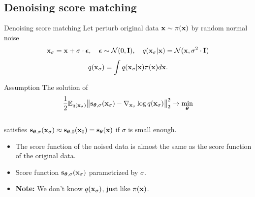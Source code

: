 \subsection{Denoising score matching}
\begin{frame}{Denoising score matching}
	Let perturb original data $\mathbf{x} \sim \pi(\mathbf{x})$ by random normal noise 
	\[
		\mathbf{x}_{\sigma} = \mathbf{x} + \sigma \cdot \boldsymbol{\epsilon}, \quad \boldsymbol{\epsilon} \sim \mathcal{N}(0, \mathbf{I}), \quad q(\mathbf{x}_{\sigma} | \mathbf{x}) = \mathcal{N}(\mathbf{x}, \sigma^2 \cdot \mathbf{I})
	\]
	\vspace{-0.4cm}
	\[
		q(\mathbf{x}_{\sigma}) = \int q(\mathbf{x}_{\sigma} | \mathbf{x}) \pi(\mathbf{x}) d\mathbf{x}.
	\]
	\vspace{-0.5cm} 
	\begin{block}{Assumption}
		The solution of 
		\[
			\frac{1}{2} \mathbb{E}_{q(\mathbf{x}_{\sigma})}\bigl\| \mathbf{s}_{\boldsymbol{\theta}, \sigma}(\mathbf{x}_{\sigma}) - \nabla_{\mathbf{x}_{\sigma}} \log q(\mathbf{x}_{\sigma}) \bigr\|^2_2 \rightarrow \min_{\boldsymbol{\theta}}
		\]
		\vspace{-0.3cm} \\
		satisfies $\mathbf{s}_{\boldsymbol{\theta}, \sigma}(\mathbf{x}_{\sigma}) \approx \mathbf{s}_{\boldsymbol{\theta}, 0}(\mathbf{x}_0) = \mathbf{s}_{\boldsymbol{\theta}}(\mathbf{x})$ if $\sigma$ is small enough.
	\end{block}
	\begin{itemize}
		\item The score function of the noised data is almost the same as the score function of the original data.
		\item Score function $\mathbf{s}_{\boldsymbol{\theta}, \sigma}(\mathbf{x}_{\sigma})$ parametrized by $\sigma$. 
		\item \textbf{Note:} We don't know $q(\mathbf{x}_{\sigma})$, just like $\pi(\mathbf{x})$.
	\end{itemize}
\end{frame}
